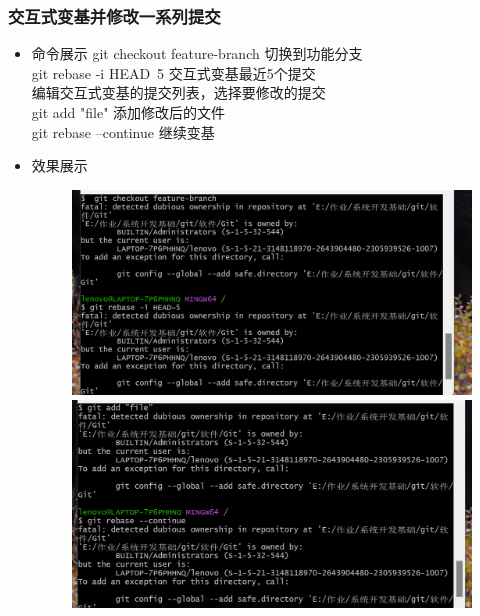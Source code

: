 \documentclass[UTF8]{ctexart}
\begin{document}
\subsubsection{交互式变基并修改一系列提交}
\begin{itemize}
  \item 命令展示
 git checkout feature-branch  切换到功能分支\\
git rebase -i HEAD~5          交互式变基最近5个提交\\
  编辑交互式变基的提交列表，选择要修改的提交\\
git add "file"             添加修改后的文件\\
git rebase --continue       继续变基\\
\item 效果展示
  \begin{figure}[H]
\includegraphics[width=1\textwidth]{12}
\includegraphics[width=1\textwidth]{13}
\end{figure}
\end{itemize}
\end{document}
